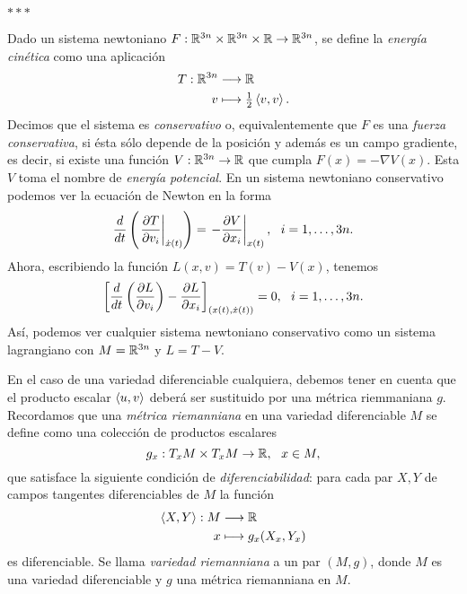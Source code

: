   \begin{center}  $\ast\ast\ast$ \end{center}
  Dado un sistema newtoniano $F:\mathbb{R}^{3n}\times\mathbb{R}^{3n}\times\mathbb{R} \rightarrow \mathbb{R}^{3n}$, se define la \emph{energía cinética} como una aplicación
  \begin{align*}
    T: \mathbb{R}^{3n} & \longrightarrow \mathbb{R} \\
    v & \longmapsto \tfrac{1}{2} \left\langle v,v\right\rangle.
  \end{align*}
  Decimos que el sistema es \emph{conservativo} o, equivalentemente que $F$ es una \emph{fuerza conservativa}, si ésta sólo depende de la posición y además es un campo gradiente, es decir, si existe una función $V:\mathbb{R}^{3n}\rightarrow \mathbb{R}$ que cumpla $F(x)=-\nabla V(x)$. Esta $V$ toma el nombre de \emph{energía potencial}.
  En un sistema newtoniano conservativo podemos ver la ecuación de Newton en la forma
  \begin{equation*}
    \frac{d}{dt} \left( \left. \parcial{T}{v_i} \right|_{\dot{x}(t)} \right) = \left.-\parcial{V}{x_i}\right|_{x(t)}, \ \ i=1,\dots,3n.
  \end{equation*}
  Ahora, escribiendo la función $L(x,v)=T(v)-V(x)$, tenemos
  \begin{equation*}
    \left[\frac{d}{dt}\left( \frac{\partial L}{\partial v_i} \right) - \frac{\partial L}{\partial x_i}\right]_{(x(t),\dot{x}(t))} = 0, \ \  i=1,\dots,3n.
  \end{equation*}
  Así, podemos ver cualquier sistema newtoniano conservativo como un sistema lagrangiano con $M=\mathbb{R}^{3n}$ y $L=T-V$.

  En el caso de una variedad diferenciable cualquiera, debemos tener en cuenta que el producto escalar $\left\langle u,v\right\rangle$ deberá ser sustituido por una métrica riemmaniana $g$. Recordamos que una \emph{métrica riemanniana} en una variedad diferenciable $M$ se define como una colección de productos escalares
  \begin{equation*}
    g_x: T_xM \times T_xM \rightarrow \mathbb{R}, \ \ x\in M,  
  \end{equation*}
  que satisface la siguiente condición de \emph{diferenciabilidad}: para cada par $X,Y$ de campos tangentes diferenciables de $M$ la función
  \begin{align*}
    \left\langle X,Y\right\rangle: M & \longrightarrow \mathbb{R} \\
    x & \longmapsto g_x(X_x,Y_x)
  \end{align*}
  es diferenciable. Se llama \emph{variedad riemanniana} a un par $(M,g)$, donde $M$ es una variedad diferenciable y $g$ una métrica riemanniana en $M$.
  
